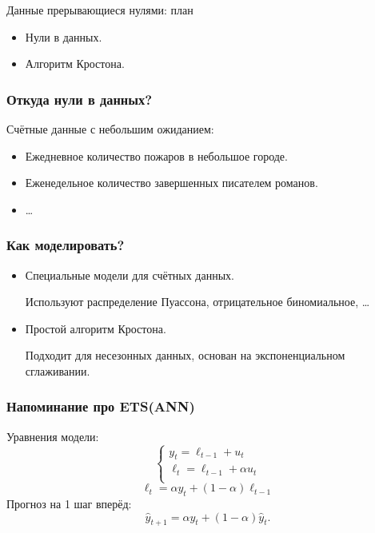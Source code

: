 
\begin{frame} %


\end{frame}



\begin{frame}{Данные прерывающиеся нулями: план}
  \begin{itemize}[<+->]
    \item Нули в данных.
    \item Алгоритм Кростона. 
  \end{itemize}

\end{frame}

\begin{frame}
  \frametitle{Откуда нули в данных?}

  Счётные данные с \alert{небольшим} ожиданием: 
  \begin{itemize}[<+->]
    \item Ежедневное количество пожаров в небольшое городе.
    \item Еженедельное количество завершенных писателем романов. 
    \item \ldots
  \end{itemize}
  
\end{frame}

\begin{frame}
  \frametitle{Как моделировать?}

  \begin{itemize}[<+->]
    \item Специальные модели для счётных данных. 
    
    Используют распределение \alert{Пуассона}, \alert{отрицательное биномиальное}, \ldots

    \item Простой алгоритм Кростона. 
    
    Подходит для \alert{несезонных} данных, основан на \alert{экспоненциальном сглаживании}. 
  \end{itemize}

  

\end{frame}


\begin{frame}
  \frametitle{Напоминание про ETS(ANN)}

  Уравнения модели:
  \[
  \begin{cases}
  y_t = \ell_{t-1} + u_t  \\
  \ell_t = \ell_{t-1} + \alpha u_t \\
  \end{cases}
  \]
  \pause
  \[
  \ell_t = \alpha y_t + (1 - \alpha) \ell_{t-1}
  \]
  \pause 
  Прогноз на 1 шаг вперёд:
  \[
  \hat y_{t+1} = \alpha y_t + (1-\alpha )\hat y_{t}.
  \]
\end{frame}


